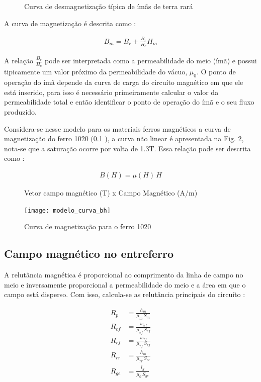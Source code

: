 \begin{figure}[!ht]
	\centering
	\def\svgwidth{0.7\columnwidth}
	
	\caption{Curva de desmagnetização típica de ímãs de terra rará}
	\label{Fig:Modelagem:circuito:passivo:ima}
\end{figure}

A curva de magnetização é descrita como :

\begin{align}
	B_m = B_r + \frac{B_r}{H_c} H_m
	\label{eq:p:ima}
\end{align}

A relação $\frac{B_r}{H_c}$ pode ser interpretada como a permeabilidade do meio (ímã) e possui tipicamente um valor próximo da permeabilidade do vácuo, $\mu_0$. O ponto de operação do ímã depende da curva de carga do circuíto magnético em que ele está inserido, para isso é necessário primeiramente calcular o valor da permeabilidade total e então identificar o ponto de operação do ímã e o seu fluxo produzido.

Considera-se nesse modelo para os materiais ferros magnéticos a curva de magnetização do ferro 1020 (\ref{} ), a curva não linear é apresentada na Fig. \ref{Fig:Modelagem:BH}, nota-se que a saturação ocorre por volta de 1.3T. Essa relação pode ser descrita como :

\begin{align}
	B(H) = \mu(H) \, H
	\label{eq:p:BH:ferro}
\end{align}

\begin{figure}[!ht]
\centering
	\caption*{ Vetor campo magnético (T) x Campo Magnético (A/m)}
 	\texttt{[image: modelo\_curva\_bh]}
	\caption{Curva de magnetização para o ferro 1020}
	\label{Fig:Modelagem:BH}
\end{figure}


\subsection{Campo magnético no entreferro}

A relutância magnética é proporcional ao comprimento da linha de campo no meio e inversamente proporcional a permeabilidade do meio e a área em que o campo está disperso. Com isso, calcula-se as relutância principais do circuíto :

\begin{align}
	 R_{p}  &= \frac{h_m}{\mu_m \, S_m}			\\
	 R_{ef} &= \frac{w_{ef}}{\mu_{ef}\, S_{ef}}  \\     
	 R_{rf} &= \frac{w_{rf}}{\mu_{rf}\, S_{rf}}   \\    
	 R_{rr} &= \frac{h_m}{\mu_{rr} \, S_{rr}}     \\      
	 R_{ge} &= \frac{l_g}{\mu_0  \, S_{ge}}        
\end{align}

